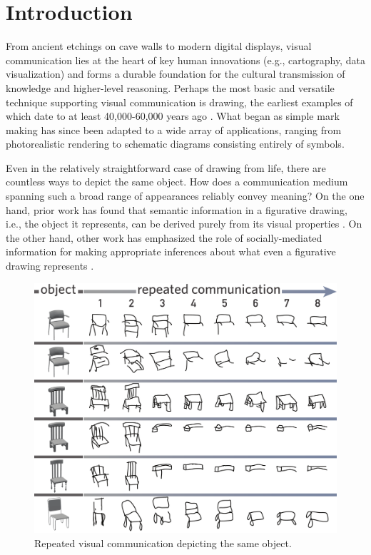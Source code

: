 \documentclass[10pt,letterpaper]{article}
\begin{document}
\section{Introduction}

From ancient etchings on cave walls to modern digital displays, visual communication lies at the heart of key human innovations (e.g., cartography, data visualization) and forms a durable foundation for the cultural transmission of knowledge and higher-level reasoning.
Perhaps the most basic and versatile technique supporting visual communication is drawing, the earliest examples of which date to at least 40,000-60,000 years ago \cite{hoffmann2018u}.
What began as simple mark making has since been adapted to a wide array of applications, ranging from photorealistic rendering to schematic diagrams consisting entirely of symbols.

Even in the relatively straightforward case of drawing from life, there are countless ways to depict the same object.
How does a communication medium spanning such a broad range of appearances reliably convey meaning?
On the one hand, prior work has found that semantic information in a figurative drawing, i.e., the object it represents, can be derived purely from its visual properties \cite{FanCommon2018}.
On the other hand, other work has emphasized the role of socially-mediated information for making appropriate inferences about what even a figurative drawing represents \cite{goodman1976languages}.

\begin{figure}
\begin{center}
\includegraphics[width=0.7\linewidth]{figures/sketch_gallery.pdf}
\caption{Repeated visual communication depicting the same object.}
\label{sketch_gallery}
\end{center}
\vspace{-1em}
\end{figure}
\end{document}
